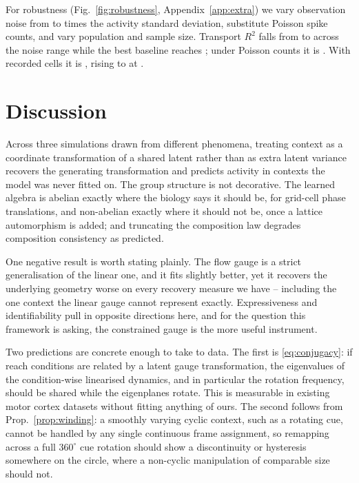 \documentclass{article}
\theoremstyle{plain}
\begin{document}
For robustness (Fig.~\ref{fig:robustness}, Appendix~\ref{app:extra}) we vary observation noise from
\robNoiseLo{} to \robNoiseHi{} times the activity standard deviation, substitute
Poisson spike counts, and vary population and sample size. Transport $R^2$ falls
from \robGNDlo{} to \robGNDhi{} across the noise range while the best baseline
reaches \robPCAhi; under Poisson counts it is \robGNDpoisson. With
\robNeuronsLo{} recorded cells it is \robGNDneuronsLo, rising to
\robGNDneuronsHi{} at \robNeuronsHi.

\FloatBarrier
\section{Discussion}

Across three simulations drawn from different phenomena, treating context as a
coordinate transformation of a shared latent rather than as extra latent variance
recovers the generating transformation and predicts activity in contexts the
model was never fitted on. The group structure is not decorative. The learned
algebra is abelian exactly where the biology says it should be, for grid-cell
phase translations, and non-abelian exactly where it should not be, once a
lattice automorphism is added; and truncating the composition law degrades
composition consistency as predicted.

One negative result is worth stating plainly. The flow gauge is a strict
generalisation of the linear one, and it fits slightly better, yet it recovers
the underlying geometry worse on every recovery measure we have -- including the
one context the linear gauge cannot represent exactly. Expressiveness and
identifiability pull in opposite directions here, and for the question this
framework is asking, the constrained gauge is the more useful instrument.

Two predictions are concrete enough to take to data. The first is
\eqref{eq:conjugacy}: if reach conditions are related by a latent gauge
transformation, the eigenvalues of the condition-wise linearised dynamics, and in
particular the rotation frequency, should be shared while the eigenplanes rotate.
This is measurable in existing motor cortex datasets without fitting anything of
ours. The second follows from Prop.~\ref{prop:winding}: a smoothly varying cyclic
context, such as a rotating cue, cannot be handled by any single continuous frame
assignment, so remapping across a full $360^\circ$ cue rotation should show a
discontinuity or hysteresis somewhere on the circle, where a non-cyclic
manipulation of comparable size should not.
\end{document}
